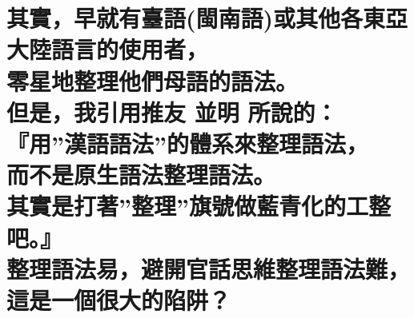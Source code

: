 %
% 
% 
% 

\chapter[其實，早就有臺語(閩南語)或其他各東亞大陸語言的使用者， 零星地整理他們母語的語法。 但是，我引用推友 並明 所說的： 『用”漢語語法”的體系來整理語法， 而不是原生語法整理語法。 其實是打著”整理”旗號做藍青化的工整吧。』 整理語法易，避開官話思維整理語法難， 這是一個很大的陷阱？]{其實，早就有臺語(閩南語)或其他各東亞大陸語言的使用者， \\[0.35em] 零星地整理他們母語的語法。 \\[0.35em] 但是，我引用推友 並明 所說的： \\[0.35em] 『用”漢語語法”的體系來整理語法， \\[0.35em] 而不是原生語法整理語法。 \\[0.35em] 其實是打著”整理”旗號做藍青化的工整吧。』 \\[0.35em] 整理語法易，避開官話思維整理語法難， \\[0.35em] 這是一個很大的陷阱？}

